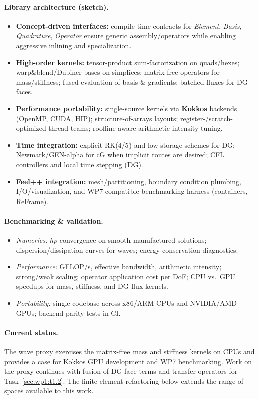 \paragraph{Library architecture (sketch).}
\begin{itemize}
  \item \textbf{Concept-driven interfaces:} compile-time contracts for \emph{Element}, \emph{Basis}, \emph{Quadrature}, \emph{Operator} ensure generic assembly/operators while enabling aggressive inlining and specialization.
  \item \textbf{High-order kernels:} tensor-product sum-factorization on quads/hexes; warp\&blend/Dubiner bases on simplices; matrix-free operators for mass/stiffness; fused evaluation of basis \& gradients; batched fluxes for DG faces.
  \item \textbf{Performance portability:} single-source kernels via \textbf{Kokkos} backends (OpenMP, CUDA, HIP); structure-of-arrays layouts; register-/scratch-optimized thread teams; roofline-aware arithmetic intensity tuning.
  \item \textbf{Time integration:} explicit RK(4/5) and low-storage schemes for DG; Newmark/GEN-alpha for cG when implicit routes are desired; CFL controllers and local time stepping (DG).
  \item \textbf{Feel++ integration:} mesh/partitioning, boundary condition plumbing, I/O/visualization, and WP7-compatible benchmarking harness (containers, ReFrame).
\end{itemize}


\paragraph{Benchmarking \& validation.}
\begin{itemize}
  \item \textit{Numerics:} $h\!p$-convergence on smooth manufactured solutions; dispersion/dissipation curves for waves; energy conservation diagnostics.
  \item \textit{Performance:} GFLOP/s, effective bandwidth, arithmetic intensity; strong/weak scaling; operator application cost per DoF; CPU vs.\ GPU speedups for mass, stiffness, and DG flux kernels.
  \item \textit{Portability:} single codebase across x86/ARM CPUs and NVIDIA/AMD GPUs; backend parity tests in CI.
\end{itemize}

\paragraph{Current status.}
The wave proxy exercises the matrix-free mass and stiffness kernels on CPUs
and provides a case for Kokkos GPU development and WP7 benchmarking. Work on
the proxy continues with fusion of DG face terms and transfer operators for
Task~\ref{sec:wp1:t1.2}. The finite-element refactoring below extends the
range of spaces available to this work.

